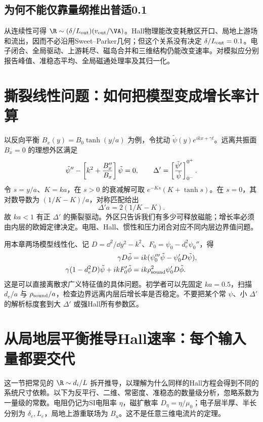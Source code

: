 \subsection{为何不能仅靠量纲推出普适0.1}
从连续性可得 $\R\sim(\delta/L_{\rm out})(v_{\rm out}/\VA)$。Hall物理能改变耗散区开口、局地上游场和流出，因而不必沿用Sweet--Parker几何；但这个关系没有决定 $\delta/L_{\rm out}=0.1$。电子闭合、全局驱动、上游耗尽、磁岛合并和三维结构仍能改变速率。对模拟应分别报告峰值、准稳态平均、全局磁通处理率及其归一化。

\section{撕裂线性问题：如何把模型变成增长率计算}
以反向平衡 $B_x(y)=B_0\tanh(y/a)$ 为例，令扰动 $\tilde\psi(y)e^{ikx+\gamma t}$。远离共振面 $B_x=0$ 的理想外区满足
\begin{equation}\tilde\psi''-\left[k^2+{B_x''\over B_x}\right]\tilde\psi=0,\qquad
\Delta'=\left[{\tilde\psi'\over\tilde\psi}\right]_{0^-}^{0^+}.
\end{equation}
令 $s=y/a$、$K=ka$，在 $s>0$ 的衰减解可取 $e^{-Ks}(K+\tanh s)$。在 $s=0$，其对数导数为 $(1/K-K)/a$，对称匹配给出
\begin{equation}\Delta'a=2(1/K-K).
\end{equation}
故 $ka<1$ 有正 $\Delta'$ 的撕裂驱动。外区只告诉我们有多少可释放磁能；增长率必须由内层的欧姆定律决定。电阻、Hall、惯性和压力闭合对应不同内层边界值问题。

用本章两场模型线性化、记 $D=\dd^2/\dd y^2-k^2$、$F_0=\psi_0-d_e^2\psi_0''$，得
\begin{align}
\gamma D\tilde\phi&=ik(\psi_0'''\tilde\psi-\psi_0'D\tilde\psi),\\
\gamma(1-d_e^2D)\tilde\psi+ikF_0'\tilde\phi&=ik\rho_{\rm sound}^2\psi_0'D\tilde\phi.
\end{align}
这是可以直接离散求广义特征值的具体问题。初学者可以先固定 $ka=0.5$，扫描 $d_e/a$ 与 $\rho_{\rm sound}/a$，检查边界远离内层后增长率是否稳定。不要把某个常 $\psi$、小 $\Delta'$ 的解析标度套到大 $\Delta'$ 或强Hall所有参数区。

\section{从局地层平衡推导Hall速率：每个输入量都要交代}
这一节把常见的 $\R\sim d_i/L$ 拆开推导，以理解为什么同样的Hall方程会得到不同的系统尺寸依赖。以下为反平行、二维、常密度、准稳态的数量级分析，忽略系数为一量级的常数。电阻仍记为SI电阻率 $\eta$，磁扩散率 $D_\eta=\eta/\mu_0$；电子层半厚、半长分别为 $\delta_e,L_e$，局地上游重联场为 $B_u$。这不是任意三维电流片的定理。\citep{Malyshkin2008,Simakov2009}

